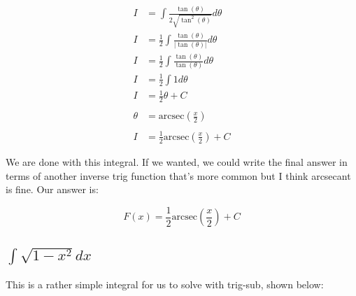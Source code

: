 \documentclass[12pt]{article}
\begin{document}
\begin{align}
    \nonumber                                                                                                         \\
    I              & = \int \frac{\tan(\theta)}{2\sqrt{\tan^2(\theta)}} d\theta                                       \\
    I              & = \frac{1}{2}\int \frac{\tan(\theta)}{|\tan(\theta)|} d\theta                                    \\
    I              & = \frac{1}{2}\int \frac{\tan(\theta)}{\tan(\theta)} d\theta                                      \\
    I              & = \frac{1}{2}\int 1 d\theta                                                                      \\
    I              & = \frac{1}{2}\theta + C                                                                          \\
    \nonumber                                                                                                         \\
    \theta         & = \text{arcsec}\left(\frac{x}{2}\right)                                                          \\
    \nonumber                                                                                                         \\
    I              & = \frac{1}{2}\text{arcsec}\left(\frac{x}{2}\right) + C
\end{align}


We are done with this integral.
If we wanted, we could write the final answer in terms of another inverse trig function that's more common but I think arcsecant is fine.
Our answer is:

$$
    F(x) = \frac{1}{2}\text{arcsec}\left(\frac{x}{2}\right) + C
$$

\subsection{$\int \sqrt{1-x^2} dx$}

This is a rather simple integral for us to solve with trig-sub, shown below:
\end{document}
